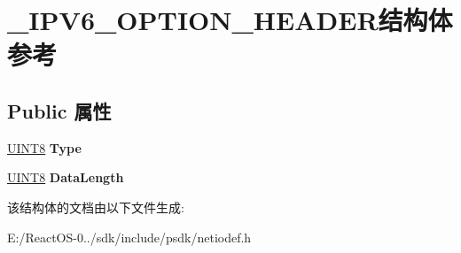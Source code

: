 \hypertarget{struct___i_p_v6___o_p_t_i_o_n___h_e_a_d_e_r}{}\section{\+\_\+\+I\+P\+V6\+\_\+\+O\+P\+T\+I\+O\+N\+\_\+\+H\+E\+A\+D\+E\+R结构体 参考}
\label{struct___i_p_v6___o_p_t_i_o_n___h_e_a_d_e_r}
\subsection*{Public 属性}
\begin{DoxyCompactItemize}
\item 
\mbox{\label{struct___i_p_v6___o_p_t_i_o_n___h_e_a_d_e_r_a6c8ffb1adb1b78fc1e6080da7f7834ff}} 
\hyperlink{_processor_bind_8h_ab27e9918b538ce9d8ca692479b375b6a}{U\+I\+N\+T8} {\bfseries Type}
\item 
\mbox{\label{struct___i_p_v6___o_p_t_i_o_n___h_e_a_d_e_r_ab0c8ba363244f4a435f32a91ca6d7a9a}} 
\hyperlink{_processor_bind_8h_ab27e9918b538ce9d8ca692479b375b6a}{U\+I\+N\+T8} {\bfseries Data\+Length}
\end{DoxyCompactItemize}


该结构体的文档由以下文件生成\+:\begin{DoxyCompactItemize}
\item 
E\+:/\+React\+O\+S-\/0../sdk/include/psdk/netiodef.\+h\end{DoxyCompactItemize}
